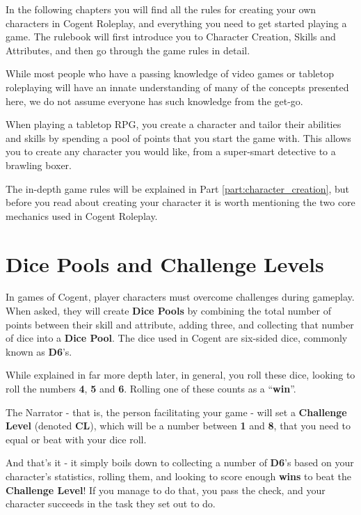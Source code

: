 In the following chapters you will find all the rules for creating your own characters in Cogent Roleplay, and everything you need to get started playing a game. The rulebook will first introduce you to Character Creation, Skills and Attributes, and then go through the game rules in detail.

While most people who have a passing knowledge of video games or tabletop roleplaying will have an innate understanding of many of the concepts presented here, we do not assume everyone has such knowledge from the get-go.

When playing a tabletop RPG, you create a character and tailor their abilities and skills by spending a pool of points that you start the game with. This allows you to create any character you would like, from a super-smart detective to a brawling boxer.

The in-depth game rules will be explained in Part \ref{part:character_creation}, but before you read about creating your character it is worth mentioning the two core mechanics used in Cogent Roleplay.

\section{Dice Pools and Challenge Levels} \label{sec:dice_pools_and_challenge_levels}

In games of Cogent, player characters must overcome challenges during gameplay. When asked, they will create \textbf{Dice Pools} by combining the total number of points between their skill and attribute, adding three, and collecting that number of dice into a \textbf{Dice Pool}. The dice used in Cogent are six-sided dice, commonly known as \textbf{D6}'s.

While explained in far more depth later, in general, you roll these dice, looking to roll the numbers \textbf{4}, \textbf{5} and \textbf{6}. Rolling one of these counts as a “\textbf{win}”.

The Narrator - that is, the person facilitating your game - will set a \textbf{Challenge Level} (denoted \textbf{CL}), which will be a number between \textbf{1} and \textbf{8}, that you need to equal or beat with your dice roll.

And that's it - it simply boils down to collecting a number of \textbf{D6}'s based on your character's statistics, rolling them, and looking to score enough \textbf{wins} to beat the \textbf{Challenge Level}! If you manage to do that, you pass the check, and your character succeeds in the task they set out to do.